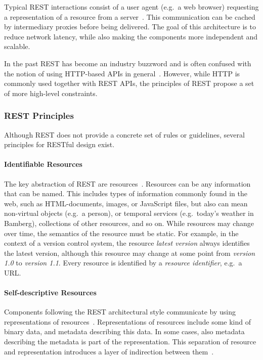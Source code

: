 Typical \ac{REST} interactions consist of a user agent (e.g.\ a web browser) requesting a representation of a resource from a server~\cite{Erenkrantz2007}.
This communication can be cached by intermediary proxies before being delivered.
The goal of this architecture is to reduce network latency, while also making the components more independent and scalable.

In the past \ac{REST} has become an industry buzzword and is often confused with the notion of using \acs{HTTP}-based \acp{API} in general~\cite{Fielding2017}.
However, while \ac{HTTP} is commonly used together with \ac{REST} \acp{API}, the principles of \ac{REST} propose a set of more high-level constraints.

\subsubsection{REST Principles}

Although \ac{REST} does not provide a concrete set of rules or guidelines, several principles for \ac{REST}ful design exist.

\paragraph{Identifiable Resources}

The key abstraction of \ac{REST} are resources~\cite{Fielding2000,Erenkrantz2007}.
Resources can be any information that can be named.
This includes types of information commonly found in the web, such as \acs{HTML}-documents, images, or JavaScript files, but also can mean non-virtual objects (e.g.~a person), or temporal services (e.g.~today's weather in Bamberg), collections of other resources, and so on.
While resources may change over time, the semantics of the resource must be static.
For example, in the context of a version control system, the resource \textit{latest version} always identifies the latest version, although this resource may change at some point from \textit{version 1.0} to \textit{version 1.1}.
Every resource is identified by a \textit{resource identifier}, e.g.~a \ac{URL}. 

\paragraph{Self-descriptive Resources}

Components following the \ac{REST} architectural style communicate by using representations of resources~\cite{Fielding2000}.
Representations of resources include some kind of binary data, and metadata describing this data.
In some cases, also metadata describing the metadata is part of the representation.
This separation of resource and representation introduces a layer of indirection between them~\cite{Erenkrantz2007}.

